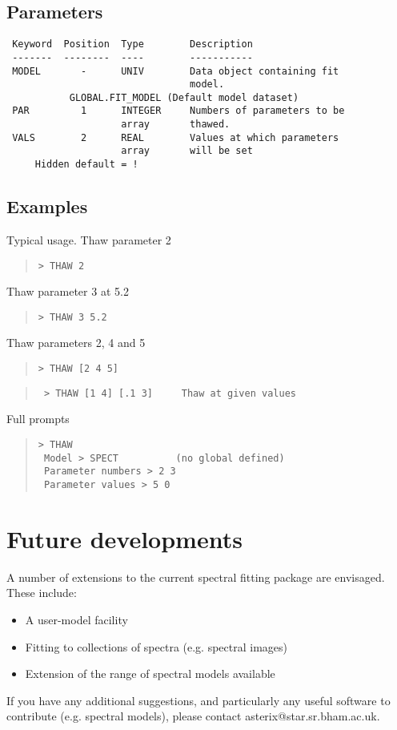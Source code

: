 \documentclass{book}
\renewcommand{\_}{{\tt\char'137}}     %
\begin{document}
\subsection{Parameters}
\begin{verbatim}
 Keyword  Position  Type        Description
 -------  --------  ----        -----------
 MODEL       -      UNIV        Data object containing fit
                                model.
           GLOBAL.FIT_MODEL (Default model dataset)
 PAR         1      INTEGER     Numbers of parameters to be
                    array       thawed.
 VALS        2      REAL        Values at which parameters
                    array       will be set
     Hidden default = !
\end{verbatim}\subsection{Examples}
Typical usage. Thaw parameter 2
\begin{quote}\begin{verbatim}
> THAW 2
\end{verbatim}\end{quote}
Thaw parameter 3 at 5.2
\begin{quote}\begin{verbatim}
> THAW 3 5.2
\end{verbatim}\end{quote}
Thaw parameters 2, 4 and 5
\begin{quote}\begin{verbatim}
> THAW [2 4 5]
\end{verbatim}\end{quote}
\begin{quote}\begin{verbatim}
 > THAW [1 4] [.1 3]     Thaw at given values
\end{verbatim}\end{quote}
Full prompts
\begin{quote}\begin{verbatim}
> THAW
 Model > SPECT          (no global defined)
 Parameter numbers > 2 3
 Parameter values > 5 0
\end{verbatim}\end{quote}
\section{Future developments}
A number of extensions to the current spectral fitting package
are envisaged. These include:
\begin{itemize}
\item A user-model facility
\item Fitting to collections of spectra (e.g. spectral images)
\item Extension of the range of spectral models available
\end{itemize}
If you have any additional suggestions, and particularly any useful
software to contribute (e.g. spectral models), please contact
asterix@star.sr.bham.ac.uk.
\end{document}
